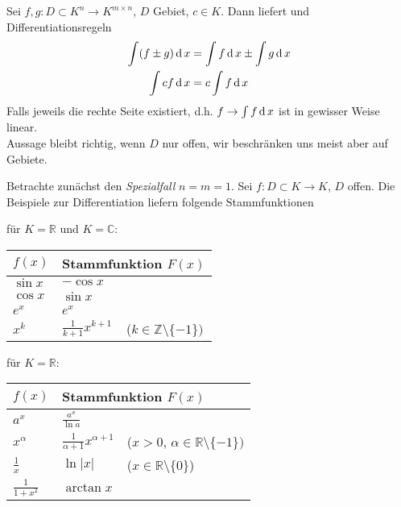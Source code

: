 Sei $f,g:D\subset K^n\to K^{m\times n}$, $D$ Gebiet, $c\in K$. Dann liefert  und Differentiationsregeln
\begin{equation}\label{xx}
\begin{split}
\int (f\pm g) \operatorname{d} x &= \int f \operatorname{d} x \pm \int g \operatorname{d} x \\
\int c f \operatorname{d} x &= c \int f \operatorname{d} x
\end{split}
\end{equation}
Falls jeweils die rechte Seite existiert, d.h. $f\to \int f\operatorname{d} x$ ist in gewisser Weise linear. \\
Aussage bleibt richtig, wenn $D$ nur offen, wir beschränken uns meist aber auf Gebiete.

Betrachte zunächst den \emph{Spezialfall} $n=m=1$. Sei $f:D\subset K\to K$, $D$ offen. Die Beispiele zur Differentiation liefern folgende Stammfunktionen

\begin{minipage}{0.45\linewidth}
	\begin{flushleft}
		für $K=\mathbb{R}$ und $K = \mathbb{C}$:
	\end{flushleft}
	\vspace*{1mm}
	\renewcommand{\arraystretch}{1.2}
	\begin{tabularx}{\linewidth}{llX}
		\toprule
		$f(x)$ & \multicolumn{2}{l}{Stammfunktion $F(x)$} \\
		\midrule
		$\sin x$ & $-\cos x$ & \\
		$\cos x$ & $\sin x$ & \\
		$e^x$ & $e^x$ & \\
		$x^k$ & $\frac{1}{k+1} x^{k+1}$ & ($k\in\mathbb{Z}\setminus\{-1\})$ \\
		\bottomrule
	\end{tabularx}
\end{minipage}
\hfill%
\begin{minipage}{0.45\linewidth}
	\begin{flushleft}
		für $K=\mathbb{R}$:
	\end{flushleft}
	\vspace*{1mm}
	\renewcommand{\arraystretch}{1.2}
	\begin{tabularx}{\linewidth}{llX}
		\toprule
		$f(x)$ & \multicolumn{2}{l}{Stammfunktion $F(x)$} \\
		\midrule
		$a^x$ & $\frac{a^x}{\ln a}$ & \\
		$x^\alpha$ & $\frac{1}{\alpha + 1} x^{\alpha + 1}$ & ($x > 0$, $\alpha \in \mathbb{R}\setminus \{ - 1\})$ \\
		$\frac{1}{x}$ & $\ln\vert x\vert$ & ($x\in\mathbb{R}\setminus \{0\}$) \\
		$\frac{1}{1+x^2}$ & $\arctan x$ & \\
		\bottomrule
	\end{tabularx}
\end{minipage}

